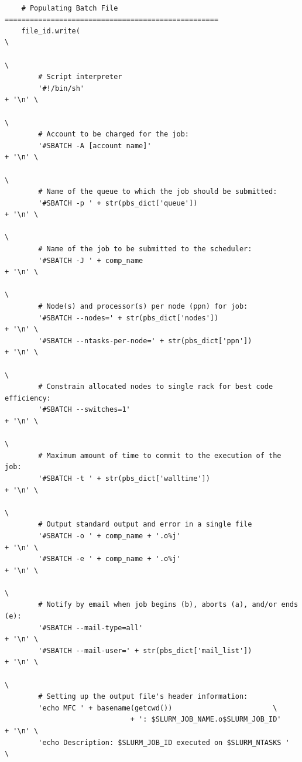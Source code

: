\documentclass[11pt]{article}
\begin{document}
\begin{lstlisting}[style=BashInputStyle]
    
    # Populating Batch File  ===================================================
    file_id.write(                                                             \
                                                                               \
        # Script interpreter
        '#!/bin/sh'                                                     + '\n' \
                                                                               \
        # Account to be charged for the job:
        '#SBATCH -A [account name]'                                     + '\n' \
                                                                               \
        # Name of the queue to which the job should be submitted:
        '#SBATCH -p ' + str(pbs_dict['queue'])                          + '\n' \
                                                                               \
        # Name of the job to be submitted to the scheduler:
        '#SBATCH -J ' + comp_name                                       + '\n' \
                                                                               \
        # Node(s) and processor(s) per node (ppn) for job:
        '#SBATCH --nodes=' + str(pbs_dict['nodes'])                     + '\n' \
        '#SBATCH --ntasks-per-node=' + str(pbs_dict['ppn'])             + '\n' \
                                                                               \
        # Constrain allocated nodes to single rack for best code efficiency:
        '#SBATCH --switches=1'                                          + '\n' \
                                                                               \
        # Maximum amount of time to commit to the execution of the job:
        '#SBATCH -t ' + str(pbs_dict['walltime'])                       + '\n' \
                                                                               \
        # Output standard output and error in a single file
        '#SBATCH -o ' + comp_name + '.o%j'                              + '\n' \
        '#SBATCH -e ' + comp_name + '.o%j'                              + '\n' \
                                                                               \
        # Notify by email when job begins (b), aborts (a), and/or ends (e):
        '#SBATCH --mail-type=all'                                       + '\n' \
        '#SBATCH --mail-user=' + str(pbs_dict['mail_list'])             + '\n' \
                                                                               \
        # Setting up the output file's header information:
        'echo MFC ' + basename(getcwd())                        \
                              + ': $SLURM_JOB_NAME.o$SLURM_JOB_ID'      + '\n' \
        'echo Description: $SLURM_JOB_ID executed on $SLURM_NTASKS '           \


\end{lstlisting}
\end{document}
